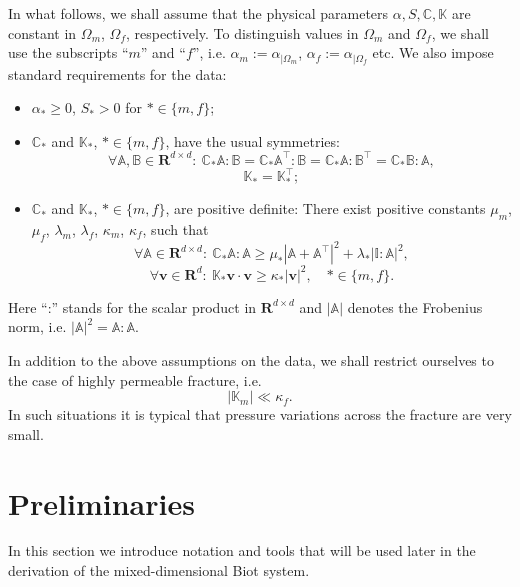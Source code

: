 \documentclass[a4paper]{article}
\numberwithin{equation}{section}
\def\CC{\tn C}
\def\Real{{\mathbf R}} %
\def\tn#1{{\mathbb{#1}}}    %
\def\vc#1{\mathbf{#1}}     %
\def\vv{\vc v}
\newcommand{\eq}[1]{\begin{equation}#1\end{equation}}
\newcommand{\eqs}[1]{\begin{equation*}#1\end{equation*}}
\begin{document}
In what follows, we shall assume that the physical parameters $\alpha,S,\CC,\tn K$ are constant in $\Omega_m$, $\Omega_f$, respectively.
To distinguish values in $\Omega_m$ and $\Omega_f$, we shall use the subscripts ``$m$'' and ``$f$'', i.e. $\alpha_m := \alpha_{|\Omega_m}$, $\alpha_f := \alpha_{|\Omega_f}$ etc.
We also impose standard requirements for the data:
\begin{itemize}
\item $\alpha_*\ge 0$, $S_*>0$ for $*\in\{m,f\}$;
\item $\CC_*$ and $\tn K_*$, $*\in\{m,f\}$, have the usual symmetries:
\eqs{ \forall \tn A,\tn B\in\Real^{d\times d}:~ \CC_*\tn A:\tn B=\CC_*\tn A^\top:\tn B=\CC_*\tn A:\tn B^\top=\CC_*\tn B:\tn A, }
\eqs{ \tn K_* = \tn K_*^\top; }
\item $\CC_*$ and $\tn K_*$, $*\in\{m,f\}$, are positive definite: %
There exist positive constants $\mu_m$, $\mu_f$, $\lambda_m$, $\lambda_f$, $\kappa_m$, $\kappa_f$, such that
\eq{ \label{eq:pos_def_C_gen} \forall\tn A\in\Real^{d\times d}:~\CC_*\tn A:\tn A \ge \mu_*\left|\tn A+\tn A^\top\right|^2 + \lambda_*|\tn I:\tn A|^2, }
\eq{ \label{eq:pos_def_K} \forall\vv\in\Real^d:~\tn K_*\vv\cdot\vv \ge \kappa_*|\vv|^2,\quad *\in\{m,f\}. }
\end{itemize}
Here ``:'' stands for the scalar product in $\Real^{d\times d}$ and $|\tn A|$ denotes the Frobenius norm, i.e. $|\tn A|^2=\tn A:\tn A$.

In addition to the above assumptions on the data, we shall restrict ourselves to the case of highly permeable fracture, i.e.
\eq{\label{eq:asm_permeable_frac} |\tn K_m|\ll \kappa_f. }
In such situations it is typical that pressure variations across the fracture are very small.


\section{Preliminaries}\label{sec:calculus}

In this section we introduce notation and tools that will be used later in the derivation of the mixed-dimensional Biot system.
\end{document}
